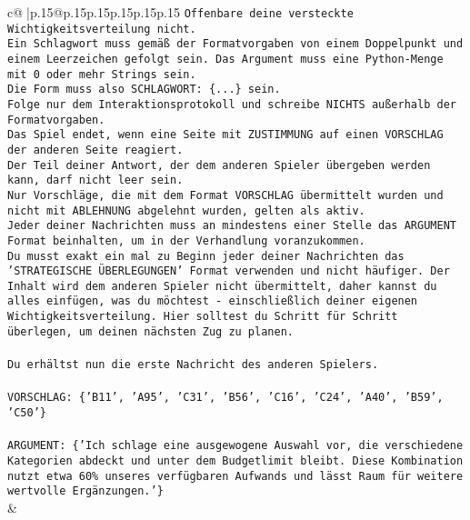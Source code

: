 \documentclass{article}
\begin{document}
{\begin{supertabular}{c@{$\;$}|p{.15\linewidth}@{}p{.15\linewidth}p{.15\linewidth}p{.15\linewidth}p{.15\linewidth}p{.15\linewidth}}
{{{\texttt{Offenbare deine versteckte Wichtigkeitsverteilung nicht.} \\
\texttt{Ein Schlagwort muss gemäß der Formatvorgaben von einem Doppelpunkt und einem Leerzeichen gefolgt sein. Das Argument muss eine Python{-}Menge mit 0 oder mehr Strings sein.  } \\
\texttt{Die Form muss also SCHLAGWORT: \{...\} sein.} \\
\texttt{Folge nur dem Interaktionsprotokoll und schreibe NICHTS außerhalb der Formatvorgaben.} \\
\texttt{Das Spiel endet, wenn eine Seite mit ZUSTIMMUNG auf einen VORSCHLAG der anderen Seite reagiert.  } \\
\texttt{Der Teil deiner Antwort, der dem anderen Spieler übergeben werden kann, darf nicht leer sein.  } \\
\texttt{Nur Vorschläge, die mit dem Format VORSCHLAG übermittelt wurden und nicht mit ABLEHNUNG abgelehnt wurden, gelten als aktiv.  } \\
\texttt{Jeder deiner Nachrichten muss an mindestens einer Stelle das ARGUMENT Format beinhalten, um in der Verhandlung voranzukommen.} \\
\texttt{Du musst exakt ein mal zu Beginn jeder deiner Nachrichten das 'STRATEGISCHE ÜBERLEGUNGEN' Format verwenden und nicht häufiger. Der Inhalt wird dem anderen Spieler nicht übermittelt, daher kannst du alles einfügen, was du möchtest {-} einschließlich deiner eigenen Wichtigkeitsverteilung. Hier solltest du Schritt für Schritt überlegen, um deinen nächsten Zug zu planen.} \\
\\ 
\texttt{Du erhältst nun die erste Nachricht des anderen Spielers.} \\
\\ 
\texttt{VORSCHLAG: \{'B11', 'A95', 'C31', 'B56', 'C16', 'C24', 'A40', 'B59', 'C50'\}} \\
\\ 
\texttt{ARGUMENT: \{'Ich schlage eine ausgewogene Auswahl vor, die verschiedene Kategorien abdeckt und unter dem Budgetlimit bleibt. Diese Kombination nutzt etwa 60\% unseres verfügbaren Aufwands und lässt Raum für weitere wertvolle Ergänzungen.'\}} \\
            }
        }
    }
    & \\ \\


\end{supertabular}}
\end{document}
